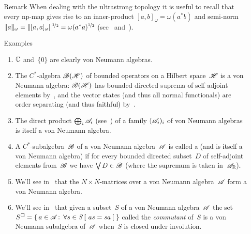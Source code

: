 \documentclass[a]{subfiles}
\begin{document}
\begin{parsec}[vna]
\begin{point}{Remark}
When dealing with the ultrastrong topology
it is useful to recall that
every np-map gives rise
to an inner-product $[a,b]_\omega = \omega(a^*b)$
and semi-norm $\|a\|_\omega = \|[a,a]_\omega\|^{\nicefrac{1}{2}}
= \omega(a^*a)^{\nicefrac{1}{2}}$
(see~ and~).
\end{point}
\begin{point}{Examples}%
\begin{enumerate}
\item
$\mathbb{C}$ and~$\{0\}$ are clearly von Neumann algebras.
\item
The $C^*$-algebra $\mathscr{B}(\mathscr{H})$
of bounded operators on a Hilbert space~$\mathscr{H}$
is a von Neumann algebra:
$\mathscr{B}(\mathscr{H})$ has bounded directed suprema
of self-adjoint elements
by~,
and the vector states
(and thus all normal functionals)
are order separating
(and thus faithful)
by~.
\item
The direct product $\bigoplus_i \mathscr{A}_i$
(see~)
of a family $(\mathscr{A}_i)_i$
of von Neumann algebras
is itself a von Neumann algebra.
\item
A $C^*$-subalgebra~$\mathscr{B}$
of a von Neumann algebra~$\mathscr{A}$
is called a 
(and is itself a von Neumann algebra)
if for every bounded directed subset~$D$
of self-adjoint elements from~$\mathscr{B}$
we have $\bigvee D\in\mathscr{B}$
(where the supremum is taken in~$\mathscr{A}_{\mathbb{R}}$).
\item
We'll see in~
that the $N\times N$-matrices over a von Neumann algebra~$\mathscr{A}$
form a von Neumann algebra.
\item
We'll see in~
that given a subset~$S$ of a von Neumann algebra~$\mathscr{A}$
the set~$S^\square = \{\,a\in\mathscr{A}\colon\, \forall s\in S\,[\ as=sa\ ]\,\}$
called the \emph{commutant} of~$S$
is a von Neumann subalgebra of~$\mathscr{A}$
when~$S$ is closed under involution.
\end{enumerate}
\end{point}
\end{parsec}
\end{document}
